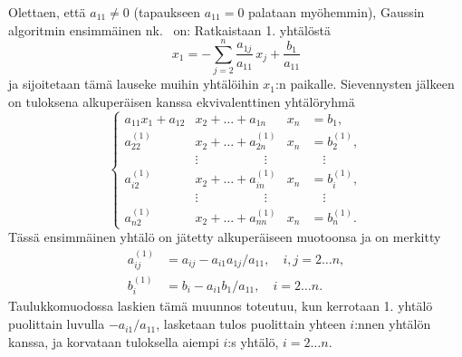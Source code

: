 Olettaen, että $a_{11} \neq 0$ (tapaukseen $a_{11} = 0$ palataan myöhemmin), Gaussin algoritmin
ensimmäinen nk.\ 
%
 on: Ratkaistaan 1. yhtälöstä
\[
x_1=-\sum_{j=2}^n \frac{a_{1j}}{a_{11}}\,x_j + \frac{b_1}{a_{11}}
\]
ja sijoitetaan tämä lauseke muihin yhtälöihin $x_1$:n paikalle. Sievennysten jälkeen on 
tuloksena alkuperäisen kanssa ekvivalenttinen yhtälöryhmä 
\[
\left\{
\begin{alignedat}{2}
a_{11} x_1 + a_{12} &x_2 + \ldots +       a_{1n}  &x_n   &= b_1, \\
       a_{22}^{(1)} &x_2 + \ldots + a_{2n}^{(1)}  &x_n   &= b_2^{(1)}, \\
                    & \vdots \qquad \qquad  \quad \ \vdots & &  \quad \vdots \\
       a_{i2}^{(1)} &x_2 + \ldots + a_{in}^{(1)}  &x_n  &=  b_i^{(1)}, \\
                    & \vdots \qquad \qquad  \quad \ \vdots & &  \quad \vdots \\
       a_{n2}^{(1)} &x_2 + \ldots + a_{nn}^{(1)}  &x_n   &=  b_n^{(1)}. \
\end{alignedat}
\right.
\]
Tässä ensimmäinen yhtälö on jätetty alkuperäiseen muotoonsa ja on merkitty
\begin{align*}
a_{ij}^{(1)} &= a_{ij} - a_{i1}a_{1j}/a_{11}, \quad i,j = 2 \ldots n, \\
b_i^{(1)} &= b_i - a_{i1}b_1/a_{11}, \quad i = 2 \ldots n.
\end{align*}
Taulukkomuodossa laskien tämä muunnos toteutuu, kun kerrotaan 1. yhtälö puolittain luvulla 
$-a_{i1}/a_{11}$, lasketaan tulos puolittain yhteen $i$:nnen yhtälön kanssa, ja korvataan 
tuloksella aiempi $i$:s yhtälö, $i=2 \ldots n$. 

